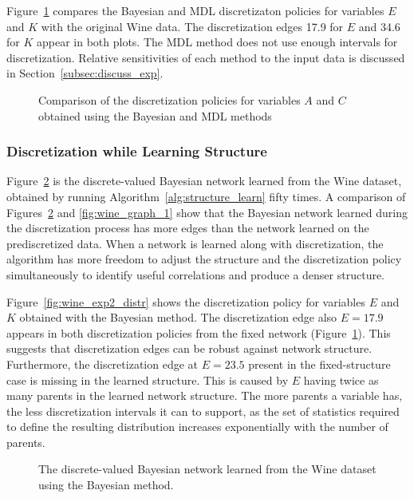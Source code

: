 Figure~\ref{fig:wine_exp1_distr} compares the Bayesian and MDL discretizaton policies for variables $E$ and $K$ with the original Wine data.
The discretization edges \num{17.9} for $E$ and \num{34.6} for $K$ appear in both plots.
The MDL method does not use enough intervals for discretization.
Relative sensitivities of each method to the input data is discussed in Section~\ref{subsec:discuss_exp}.

\begin{figure}[ht]
  \centering
  
  \caption{Comparison of the discretization policies for variables $A$ and $C$ obtained using the Bayesian and MDL methods}
  \label{fig:wine_exp1_distr}
\end{figure}

\subsubsection{Discretization while Learning Structure}
\label{subsubsec:wine_exp2}

Figure~\ref{fig:wine_graph_2} is the discrete-valued Bayesian network learned from the Wine dataset, obtained by running Algorithm~\ref{alg:structure_learn} fifty times.
A comparison of Figures~\ref{fig:wine_graph_2} and \ref{fig:wine_graph_1} show that the Bayesian network learned during the discretization process has more edges than the network learned on the prediscretized data.
When a network is learned along with discretization, the algorithm has more freedom to adjust the structure and the discretization policy simultaneously to identify useful correlations and produce a denser structure.

Figure~\ref{fig:wine_exp2_distr} shows the discretization policy for variables $E$ and $K$ obtained with the Bayesian method.
The discretization edge also $E = 17.9$ appears in both discretization policies from the fixed network (Figure~\ref{fig:wine_exp1_distr}).
This suggests that discretization edges can be robust against network structure.
Furthermore, the discretization edge at $E = 23.5$ present in the fixed-structure case is missing in the learned structure.
This is caused by $E$ having twice as many parents in the learned network structure.
The more parents a variable has, the less discretization intervals it can to support, as the set of statistics required to define the resulting distribution increases exponentially with the number of parents.

\begin{figure}[ht]
  \centering
  \scalebox{0.7}{}
  \caption{The discrete-valued Bayesian network learned from the Wine dataset using the Bayesian method.}
  \label{fig:wine_graph_2}
\end{figure}

